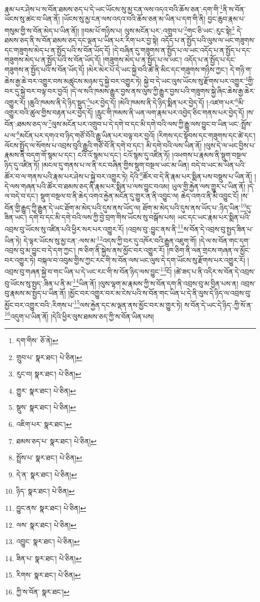 རྣམ་པར་ཤེས་པ་ས་བོན་ཐམས་ཅད་པ་དེ་ཡང་ཡོངས་སུ་མྱ་ངན་ལས་འདའ་བའི་ཆོས་ཅན་:དག་གི་\footnote{དག་གིས་  ཅོ་ནེ། }ནི་ས་བོན་ཡོངས་སུ་ཚང་བ་ཡིན་ནོ། །ཡོངས་སུ་མྱ་ངན་ལས་འདའ་བའི་ཆོས་ཅན་མ་ཡིན་པ་དག་གི་ནི། བྱང་ཆུབ་རྣམ་པ་གསུམ་གྱི་ས་བོན་མེད་པ་ཡིན་ནོ།། །།བམ་པོ་གཉིས་པ། ལུས་མངོན་པར་:འགྲུབ་པ་\footnote{གྲུབ་པ་  སྣར་ཐང་།  པེ་ཅིན། }གང་ཅི་ཡང་:རུང་སྟེ།\footnote{རུང་བ།  སྣར་ཐང་།  པེ་ཅིན། } དེ་ཐམས་ཅད་ནི་ས་བོན་ཐམས་ཅད་དང་ལྡན་པ་ཡིན་པར་རིག་པར་བྱ་སྟེ། འདོད་པ་ན་སྤྱོད་པའི་ལུས་ལ་ཡང་གཟུགས་དང་གཟུགས་མེད་པ་ན་སྤྱོད་པའི་ས་བོན་ཡོད་དོ། །དེ་བཞིན་དུ་གཟུགས་ན་སྤྱོད་པ་ལ་ཡང་འདོད་པ་ན་སྤྱོད་པ་དང་གཟུགས་མེད་པ་ན་སྤྱོད་པའི་ས་བོན་ཡོད་དོ། །གཟུགས་མེད་པ་ན་སྤྱོད་པ་ལ་ཡང་། འདོད་པ་ན་སྤྱོད་པ་དང་གཟུགས་ན་སྤྱོད་པའི་ས་བོན་ཡོད་དོ། །མེར་མེར་པོ་དེ་ཡང་སྐྱེ་བའི་ཚེ་ནི་མིང་དང་གཟུགས་གཉིས་ཀྱང་། དེ་གཉི་ག་ཆེས་རྒྱ་ཆེ་བར་འགྱུར་བས་མཚུངས་མཉམ་དུ་སྐྱེ་བར་འགྱུར་ཏེ། སྐྱེ་བ་དེ་ཡང་ལུས་ཡོངས་སུ་རྫོགས་པར་འགྱུར་\footnote{གྱུར་  སྣར་ཐང་།  པེ་ཅིན། }གྱི་བར་དུ་སྐྱེ་བར་བལྟ་བར་བྱའོ། །དེ་ལ་སའི་ཁམས་རྒྱུར་བྱས་ནས་ལུས་ཀྱི་རྒྱུར་བྱས་པའི་གཟུགས་སྐྱེ་ཞིང་ཆེས་རྒྱ་ཆེར་འགྱུར་རོ། །ཆུའི་ཁམས་ནི་དེ་ཉིད་སྡུད་\footnote{སྡུས་  སྣར་ཐང་།  པེ་ཅིན། }པར་བྱེད་དོ། །མེའི་ཁམས་ནི་དེ་ཉིད་སྨིན་པར་བྱེད་དོ། །:འཛག་པར་\footnote{འཇིག་པར་  སྣར་ཐང་། }མི་འགྱུར་བའི་ཚུལ་གྱིས་བརྟན་པར་བྱེད་དོ། །རླུང་གི་ཁམས་ནི་ཡན་ལག་རྣམ་པར་འབྱེད་ཅིང་གནས་པར་བྱེད་དོ། །ས་བོན་:ཐམས་ཅད་ལ་\footnote{ཐམས་ཅད་པ་  སྣར་ཐང་།  པེ་ཅིན། }ལུས་མངོན་པར་འགྲུབ་པ་དེ་དགེ་བ་དང་མི་དགེ་བའི་ལས་ཀྱི་རྒྱུ་ལས་བྱུང་བ་ཡིན་ཡང་:སྤྲོས་པ་ལ་\footnote{སྤྲོས་པ་  སྣར་ཐང་།  པེ་ཅིན། }མངོན་པར་དགའ་བ་ཉིད་གཙོ་བོའི་རྒྱུ་ཡིན་པར་བལྟ་བར་བྱའོ། །རིགས་དང་སྟོབས་དང་གཟུགས་དང་ཚེ་དང་། ལོངས་སྤྱོད་ལ་སོགས་པ་འབྲས་བུའི་རྒྱུའི་གཙོ་བོ་ནི་དགེ་བ་དང་། མི་དགེ་བའི་ལས་ཡིན་ནོ། །ལུས་དེ་ལ་ཡང་བྱིས་པ་རྣམས་ནི་བདག་གོ་སྙམ་པ་དང་། ངའི་འོ་སྙམ་པ་དང་། ངའོ་སྙམ་དུ་འཛིན་ཏོ། །འཕགས་པ་རྣམས་ནི་སྡུག་བསྔལ་ཉིད་དུ་འཛིན་ཏོ། །མངལ་དུ་གནས་པ་ལ་ནི་རང་བཞིན་གྱིས་སྡུག་བསྔལ་ཡང་མ་ཡིན། བདེ་བ་ཡང་མ་ཡིན་པའི་ཚོར་བ་ལ་གནས་པའི་རྣམ་པར་ཤེས་པ་སྐྱེ་བར་འགྱུར་ཏེ། དེའི་\footnote{དེ་ན་  སྣར་ཐང་།  པེ་ཅིན། }ཚོར་བ་དེ་ནི་རྣམ་པར་སྨིན་པས་བསྡུས་པ་ཡིན་ནོ། །དེ་ལས་གཞན་པའི་ཚོར་བ་ཐམས་ཅད་ནི་རྣམ་པར་སྨིན་པ་ལས་བྱུང་བའམ། ཡུལ་གྱི་རྐྱེན་ལས་གྱུར་པ་ཡིན་ནོ། །དེ་ལ་བདེ་བ་དང་། སྡུག་བསྔལ་བ་ནི་ཆེད་འགའ་རྐྱེན་མངོན་དུ་གྱུར་ན་ནི་འབྱུང་ལ། ཆེད་འགའ་ནི་མི་འབྱུང་ངོ། །ས་བོན་གྱི་རྒྱུད་ཀྱི་རྒྱུན་དེ་ཡང་ཐོག་མ་མེད་པའི་དུས་ནས་ཡོད་ལ། ཐོག་མ་མེད་པའི་དུས་ནས་ཡོད་པ་:ཉིད་ཡིན་\footnote{ཉིད་  སྣར་ཐང་།  པེ་ཅིན། }དུ་ཟིན་ཡང་། དགེ་བ་དང་མི་དགེ་བའི་ལས་ཀྱི་བྱེ་བྲག་གིས་ཡོངས་སུ་བསྒོས་པས། ཡང་དང་ཡང་རྣམ་པར་སྨིན་པའི་འབྲས་བུ་ཡོངས་སུ་འཛིན་པའི་ཕྱིར་སར་པར་འགྱུར་རོ། །འབྲས་བུ་:བྱུང་ནས་ནི་\footnote{བྱུང་ནས་  སྣར་ཐང་།  པེ་ཅིན། }ས་བོན་དེ་འབྲས་བུ་སྤྱད་ཟིན་པ་ཡིན་ཏེ། དེ་ལྟར་ཡོངས་སུ་མྱ་ངན་:ལས་མ་\footnote{ལས་  སྣར་ཐང་།  པེ་ཅིན། }འདས་ཀྱི་བར་དུ་འཁོར་བའི་རྒྱུན་འཇུག་གོ། །དེ་ལ་ས་བོན་གང་དག་འབྲས་བུ་མ་བྱུང་བ་དེ་དག་ཀྱང་། ཁ་ཅིག་ནི་སྐྱེས་ནས་མྱོང་བར་འགྱུར་རོ། །ཁ་ཅིག་ནི་ལན་གྲངས་གཞན་ལ་མྱོང་བར་འགྱུར་ཏེ། བསྐལ་བ་འབུམ་གྱིས་ཀྱང་རང་གི་ས་བོན་ལས་ཡང་ལུས་དེ་དག་ཡོངས་སུ་རྫོགས་པར་འགྱུར་རོ། །འབྲས་བུ་གཞན་སྐྱེ་བ་གང་ཡིན་པ་དེ་ཡང་རང་གི་ས་བོན་ཉིད་ལས་བྱུང་\footnote{འབྱུང་  སྣར་ཐང་།  པེ་ཅིན། }ངོ། །ཚེ་ཟད་པ་ནི་འདིར་ས་བོན་དེ་འབྲས་བུ་ཡོངས་སུ་སྤྱད་:ཟིན་པ་ནི་མ་\footnote{ཟིན་པ་  སྣར་ཐང་།  པེ་ཅིན། }ཡིན་ནོ། །ལུས་ལྷག་མ་རྣམས་ཀྱི་ས་བོན་དག་ནི་འབྲས་བུ་མ་བྱིན་པས་ན། འབྲས་བུ་རྣམས་མ་སྤྱད་པ་ཡིན་ནོ། །མྱོང་བར་འགྱུར་བར་མ་ངེས་པའི་ས་བོན་གང་ཡིན་པ་དེ་ནི་ལུས་དེ་ཉིད་ལ་འབྲས་བུ་མྱོང་བར་འགྱུར་བའི་:རིགས་པ་\footnote{རིགས་  སྣར་ཐང་།  པེ་ཅིན། }ལས་རྐྱེན་དང་མ་ལྡན་ནས་མྱོང་བར་མ་གྱུར་ཏེ། ས་བོན་དེ་ཡང་དེ་ཉིད་:ཀྱི་སོ་ན་\footnote{ཀྱི་ས་བོན་  སྣར་ཐང་། }འདུག་པ་ཡིན་ནོ། །དེའི་ཕྱིར་ལུས་ཐམས་ཅད་ཀྱི་ས་བོན་ཡིན་པས། 